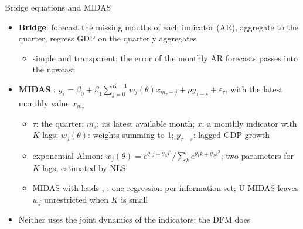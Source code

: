 \begin{frame}{Bridge equations and MIDAS}
\itemsize{\small}
\begin{itemize}
    \item \textbf{Bridge}: forecast the missing months of each indicator (AR), aggregate to the quarter, regress GDP on the quarterly aggregates 
    \begin{itemize}
        \item simple and transparent; the error of the monthly AR forecasts passes into the nowcast
    \end{itemize}
    \item \textbf{MIDAS} : $y_\tau = \beta_0 + \beta_1\sum_{j=0}^{K-1}w_j(\theta)x_{m_\tau - j} + \rho y_{\tau - s} + \varepsilon_\tau$, with the latest monthly value $x_{m_\tau}$
    \begin{itemize}
        \item $\tau$: the quarter; $m_\tau$: its latest available month; $x$: a monthly indicator with $K$ lags; $w_j(\theta)$: weights summing to 1; $y_{\tau - s}$: lagged GDP growth
        \item exponential Almon: $w_j(\theta) = e^{\theta_1j + \theta_2j^2}/\sum_ke^{\theta_1k + \theta_2k^2}$; two parameters for $K$ lags, estimated by NLS
        \item MIDAS with leads , : one regression per information set; U-MIDAS leaves $w_j$ unrestricted when $K$ is small 
    \end{itemize}
    \item Neither uses the joint dynamics of the indicators; the DFM does
\end{itemize}
\end{frame}

